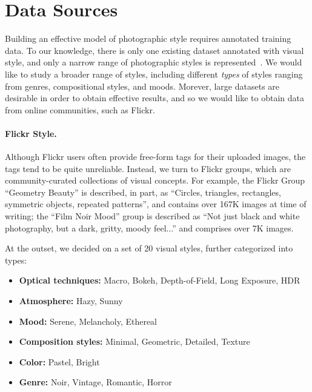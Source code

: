 \section{Data Sources}

Building an effective model of photographic style requires annotated training data.  To our knowledge, there is only one existing dataset annotated with visual style, and only a narrow range of photographic styles is represented~\cite{Murray-CVPR-2012}.
We would like to study a broader range of styles, including different \textit{types} of styles ranging from genres, compositional styles, and moods.
Morever, large datasets are desirable in order to obtain effective results, and so we would like to obtain data from online communities, such as Flickr.

\paragraph{Flickr Style.}
Although Flickr users often provide free-form tags for their uploaded images, the tags tend to be quite unreliable.
Instead, we turn to Flickr groups, which are community-curated collections of visual concepts.
For example, the Flickr Group ``Geometry Beauty'' is described, in part, as ``Circles, triangles, rectangles, symmetric objects, repeated patterns'', and contains over 167K images at time of writing; the ``Film Noir Mood'' group is described as ``Not just  black and white photography, but a dark, gritty, moody feel...'' and comprises over 7K images.

At the outset, we decided on a set of 20 visual styles, further categorized into types:
\begin{itemize}
\setlength{\itemsep}{-.5em}
\item \textbf{Optical techniques:} Macro, Bokeh, Depth-of-Field, Long Exposure, HDR
\item \textbf{Atmosphere:} Hazy, Sunny
\item \textbf{Mood:} Serene, Melancholy, Ethereal
\item \textbf{Composition styles:} Minimal, Geometric, Detailed, Texture
\item \textbf{Color:} Pastel, Bright
\item \textbf{Genre:} Noir, Vintage, Romantic, Horror
\end{itemize}

